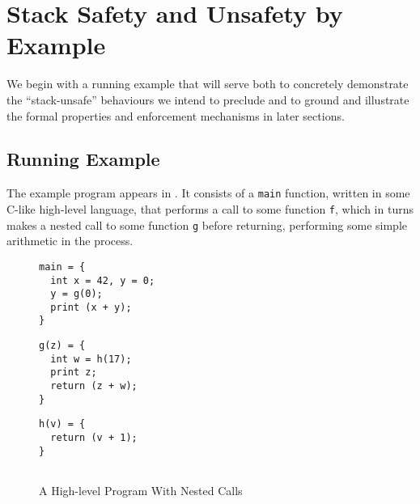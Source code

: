 \documentclass[acmsmall,review,anonymous]{acmart}\settopmatter{printfolios=true,printccs=false,printacmref=false}
\begin{document}
\section{Stack Safety and Unsafety by Example}
\label{sec:running-example}

We begin with a running example that will serve both to concretely
demonstrate the ``stack-unsafe'' behaviours we intend to preclude and to
ground and illustrate the formal properties and enforcement mechanisms in
later sections.

\subsection{Running Example}

The example program appears in . It consists of a
{\tt main} function, written in some C-like high-level language, that
performs a call to some function {\tt f}, which in turns makes a nested call
to some function {\tt g} before returning, performing some simple arithmetic
in the process.

\begin{figure}[b]
\hfill
    \begin{minipage}{.3\textwidth}
\begin{verbatim}
main = {
  int x = 42, y = 0;
  y = g(0);
  print (x + y);
}
\end{verbatim}
    \end{minipage}
    \begin{minipage}{.3\textwidth}
\begin{verbatim}
g(z) = {
  int w = h(17);
  print z;
  return (z + w);
}
\end{verbatim}
    \end{minipage}
    \begin{minipage}{.3\textwidth}
\begin{verbatim}
h(v) = {
  return (v + 1);
}


\end{verbatim}
    \end{minipage}
\caption{A High-level Program With Nested Calls}
\label{fig:running-program}
\end{figure}


\newcommand*{\add}{\textsc{add}}
\newcommand*{\addi}{\textsc{addi}}
\newcommand*{\sw}{\textsc{sw}}
\newcommand*{\lw}{\textsc{lw}}
\newcommand*{\jal}{\textsc{jal}}
\newcommand*{\jalr}{\textsc{jalr}}
\newcommand*{\rsp}{\textsc{sp}}
\newcommand*{\rra}{\textsc{ra}}
\newcommand*{\rout}{\textsc{out}}
\end{document}
